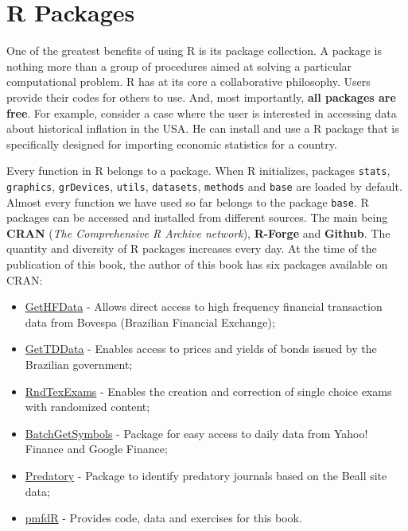 \documentclass[11pt,]{book}
\begin{document}
\section{R Packages}\label{r-packages}

One of the greatest benefits of using R is its package collection. A
package is nothing more than a group of procedures aimed at solving a
particular computational problem. R has at its core a collaborative
philosophy. Users provide their codes for others to use. And, most
importantly, \textbf{all packages are free}. For example, consider a
case where the user is interested in accessing data about historical
inflation in the USA. He can install and use a R package that is
specifically designed for importing economic statistics for a country.

Every function in R belongs to a package. When R initializes, packages
\texttt{stats}, \texttt{graphics}, \texttt{grDevices}, \texttt{utils},
\texttt{datasets}, \texttt{methods} and \texttt{base} are loaded by
default. Almost every function we have used so far belongs to the
package \texttt{base}. R packages can be accessed and installed from
different sources. The main being \textbf{CRAN} (\emph{The Comprehensive
R Archive network}), \textbf{R-Forge} and \textbf{Github}. The quantity
and diversity of R packages increases every day. At the time of the
publication of this book, the author of this book has six packages
available on CRAN:   

\begin{itemize}
\item
  \href{https://CRAN.R-project.org/package=GetHFData}{GetHFData} -
  Allows direct access to high frequency financial transaction data from
  Bovespa (Brazilian Financial Exchange);
\item
  \href{https://CRAN.R-project.org/package=GetTDData}{GetTDData} -
  Enables access to prices and yields of bonds issued by the Brazilian
  government;
\item
  \href{https://CRAN.R-project.org/package=RndTexExams}{RndTexExams} -
  Enables the creation and correction of single choice exams with
  randomized content;
\item
  \href{https://CRAN.R-project.org/package=BatchGetSymbols}{BatchGetSymbols}
  - Package for easy access to daily data from Yahoo! Finance and Google
  Finance;
\item
  \href{https://CRAN.R-project.org/package=predatory}{Predatory} -
  Package to identify predatory journals based on the Beall site data;
\item
  \href{https://CRAN.R-project.org/package=pmfdR}{pmfdR} - Provides
  code, data and exercises for this book.
\end{itemize}
\end{document}
